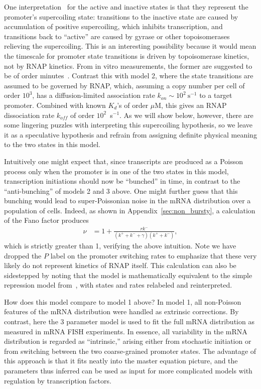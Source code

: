 One interpretation~\cite{Chong2014, Sevier2016} for the active and inactive
states is that they represent the promoter's supercoiling state: transitions to
the inactive state are caused by accumulation of positive supercoiling, which
inhibits transcription, and transitions back to ``active'' are caused by gyrase
or other topoisomerases relieving the supercoiling. This is an interesting
possibility because it would mean the timescale for promoter state transitions
is driven by topoisomerase kinetics, not by RNAP kinetics. From in vitro
measurements, the former are suggested to be of order minutes~\cite{Chong2014}.
Contrast this with model 2, where the state transitions are assumed to be
governed by RNAP, which, assuming a copy number per cell of order $10^3$, has a
diffusion-limited association rate $k_{on} \sim 10^2~\text{s}^{-1}$ to a target
promoter. Combined with known $K_d$'s of order $\mu$M, this gives an RNAP
dissociation rate $k_{off}$ of order $10^2$~s$^{-1}$. As we will show below,
however, there are some lingering puzzles with interpreting this supercoiling
hypothesis, so we leave it as a speculative hypothesis and refrain from
assigning definite physical meaning to the two states in this model.

Intuitively one might expect that, since transcripts are produced as a Poisson
process only when the promoter is in one of the two states in this model,
transcription initiations should now be ``bunched'' in time, in contrast to the
``anti-bunching'' of models 2 and 3 above. One might further guess that this
bunching would lead to super-Poissonian noise in the mRNA distribution over a
population of cells.  Indeed, as shown in Appendix~\ref{sec:non_bursty}, a
calculation of the Fano factor produces
\begin{align}
\nu &= 1 + \frac{r k^-}{(k^+ + k^- + \gamma)(k^+ + k^-)},
\label{eq:model4_fano}
\end{align}
which is strictly greater than 1, verifying the above intuition. Note we have
dropped the $P$ label on the promoter switching rates to emphasize that these
very likely do not represent kinetics of RNAP itself. This calculation can also
be sidestepped by noting that the model is mathematically equivalent to the
simple repression model from~\cite{Jones2014}, with states and rates relabeled
and reinterpreted.

How does this model compare to model 1 above? In model 1, all non-Poisson
features of the mRNA distribution were handled as extrinsic corrections. By
contrast, here the 3 parameter model is used to fit the full mRNA distribution
as measured in mRNA FISH experiments. In essence, all variability in the mRNA
distribution is regarded as ``intrinsic,'' arising either from stochastic
initiation or from switching between the two coarse-grained promoter states. The
advantage of this approach is that it fits neatly into the master equation
picture, and the parameters thus inferred can be used as input for more
complicated models with regulation by transcription factors.

